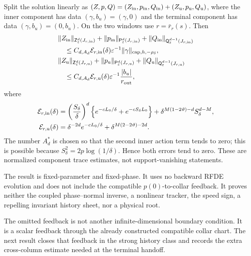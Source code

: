 \begin{proposition}
Split the solution linearly as
\((Z,p,Q)=(Z_{\rm in},p_{\rm in},Q_{\rm in})
 +(Z_{\rm u},p_{\rm u},Q_{\rm u})\), where the inner component has data
\((\gamma,b_u)=(\gamma,0)\) and the terminal component has data
\((\gamma,b_u)=(0,b_u)\).  On the two windows use
\(r=\bar r_r(s)\).  Then
\begin{align}
 &\|Z_{\rm in}\|_{\mathsf Z_\varepsilon^d(J_{r,\rm in})}
 +\|p_{\rm in}\|_{\mathsf P_\varepsilon^d(J_{r,\rm in})}
 +\|Q_{\rm in}\|_{\mathsf Q_\varepsilon^{d-1}(J_{r,\rm in})}
 \notag\\
 &\quad\le C_{d,A_d}\mathcal E_{r,\rm in}(\delta)
             \varepsilon^{-1}
             \|\gamma\|_{\mathrm{cap},h,-\rho_\delta},      \label{eq:repelling-inner-flush}\\
 &\|Z_{\rm u}\|_{\mathsf Z_\varepsilon^d(J_{r,\rm u})}
 +\|p_{\rm u}\|_{\mathsf P_\varepsilon^d(J_{r,\rm u})}
 +\|Q_{\rm u}\|_{\mathsf Q_\varepsilon^{d-1}(J_{r,\rm u})}
 \notag\\
 &\quad\le C_{d,A_d}\mathcal E_{r,\rm u}(\delta)
             \varepsilon^{-1}\frac{|b_u|}{r_{\rm out}},      \label{eq:repelling-terminal-flush}
\end{align}
where
\begin{align}
 \mathcal E_{r,\rm in}(\delta)
 &=\left(\frac{S_\delta}{\delta}\right)^d
       \left\{e^{-cL_0/\delta}+e^{-cS_\delta L_0}\right\}
   +\delta^{M(1-2\vartheta)-d}S_\delta^{d-M},\notag\\
 \mathcal E_{r,\rm u}(\delta)
 &=\delta^{-2d}e^{-cL_0/\delta}
   +\delta^{M(2-2\vartheta)-2d}.                  \label{eq:repelling-flush-errors}
\end{align}
The number \(A_d^*\) is chosen so that the second inner action term tends to
zero; this is possible because \(S_\delta^2=2p\log(1/\delta)\).  Hence both
errors tend to zero.  These are normalized component trace estimates, not
support-vanishing statements.

The result is fixed-parameter and fixed-phase.  It uses no backward RFDE
evolution and does not include the compatible \(p(0)\)-to-collar feedback.
It proves neither the coupled phase--normal inverse, a nonlinear tracker,
the speed sign, a repelling invariant history sheet, nor a physical root.
\end{proposition}

The omitted feedback is not another infinite-dimensional boundary
condition.  It is a scalar feedback through the already constructed
compatible collar chart.  The next result closes that feedback in the
strong history class and records the extra cross-column estimate needed at
the terminal handoff.

